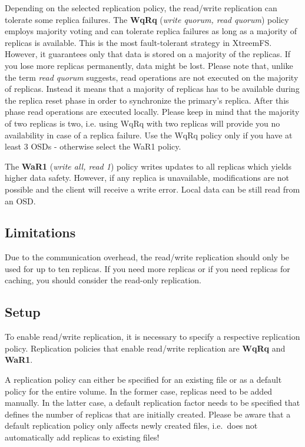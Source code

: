 \documentclass[a4paper,10pt]{book}
\begin{document}
Depending on the selected replication policy, the read/write replication can tolerate some replica failures. The \textbf{WqRq} (\textit{write quorum, read quorum}) policy employs majority voting and can tolerate replica failures as long as a majority of replicas is available. This is the most fault-tolerant strategy in XtreemFS. However, it guarantees only that data is stored on a majority of the replicas. If you lose more replicas permanently, data might be lost. Please note that, unlike the term \textit{read quorum} suggests, read operations are not executed on the majority of replicas. Instead it means that a majority of replicas has to be available during the replica reset phase in order to synchronize the primary's replica. After this phase read operations are executed locally. Please keep in mind that the majority of two replicas is two, i.e. using WqRq with two replicas will provide you no availability in case of a replica failure. Use the WqRq policy only if you have at least 3 OSDs - otherwise select the WaR1 policy.

The \textbf{WaR1} (\textit{write all, read 1}) policy writes updates to all replicas which yields higher data safety. However, if any replica is unavailable, modifications are not possible and the client will receive a write error. Local data can be still read from an OSD.

\subsection{Limitations}
Due to the communication overhead, the read/write replication should only be used for up to ten replicas. If you need more replicas or if you need replicas for caching, you should consider the read-only replication.

\subsection{Setup}
To enable read/write replication, it is necessary to specify a respective replication policy. Replication policies that enable read/write replication are \textbf{WqRq} and \textbf{WaR1}.

A replication policy can either be specified for an existing file or as a default policy for the entire volume. In the former case, replicas need to be added manually. In the latter case, a default replication factor needs to be specified that defines the number of replicas that are initially created. Please be aware that a default replication policy only affects newly created files, i.e.\ does not automatically add replicas to existing files!
\end{document}
